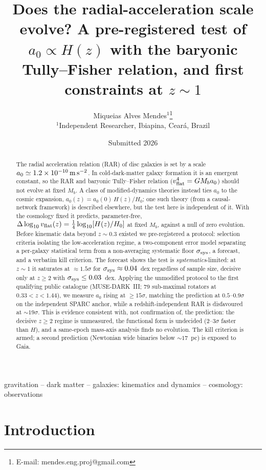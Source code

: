 \documentclass[fleqn,usenatbib]{mnras}
\title[Does the radial-acceleration scale evolve?]{Does the
radial-acceleration scale evolve? A pre-registered test of
$a_0\propto H(z)$ with the baryonic Tully--Fisher relation,
and first constraints at $z\sim1$}
\author[M. A. Mendes]{Miqueias Alves Mendes$^{1}$\thanks{E-mail:
mendes.eng.proj@gmail.com}\\
$^{1}$Independent Researcher, Ibiapina, Cear\'a, Brazil}
\date{Submitted 2026}
\newcommand{\dlogv}{\Delta\log_{10} v_{\rm flat}}
\newcommand{\azero}{a_0}
\newcommand{\ssys}{\sigma_{\rm sys}}
\begin{document}
\maketitle

\begin{abstract}
The radial acceleration relation (RAR) of disc galaxies is set by a scale
$\azero\simeq1.2\times10^{-10}\,{\rm m\,s^{-2}}$. In cold-dark-matter galaxy
formation it is an emergent constant, so the RAR and baryonic Tully--Fisher
relation ($v_{\rm flat}^4=GM_b\azero$) should not evolve at fixed $M_b$. A class of
modified-dynamics theories instead ties $\azero$ to the cosmic expansion,
$\azero(z)=\azero(0)\,H(z)/H_0$; one such theory (from a causal-network framework)
is described elsewhere, but the test here is independent of it. With the cosmology
fixed it predicts, parameter-free, $\dlogv(z)=\tfrac14\log_{10}[H(z)/H_0]$ at fixed
$M_b$, against a null of zero evolution. Before kinematic data beyond $z\sim0.3$
existed we pre-registered a protocol: selection criteria isolating the
low-acceleration regime, a two-component error model separating a per-galaxy
statistical term from a non-averaging systematic floor $\ssys$, a forecast, and a
verbatim kill criterion. The forecast shows the test is \emph{systematics}-limited:
at $z\sim1$ it saturates at $\approx1.5\sigma$ for $\ssys\approx0.04$~dex regardless
of sample size, decisive only at $z\ge2$ with $\ssys\le0.03$~dex. Applying the
unmodified protocol to the first qualifying public catalogue
(MUSE-DARK~III; 79 sub-maximal rotators at $0.33<z<1.44$), we measure
$\azero$ rising at $\ge15\sigma$, matching the prediction at $0.5$--$0.9\sigma$ on
the independent SPARC anchor, while a redshift-independent RAR is disfavoured at
$\sim19\sigma$. This is evidence consistent with, not confirmation of, the
prediction: the decisive $z\ge2$ regime is unmeasured, the functional form is
undecided ($2$--$3\sigma$ faster than $H$), and a same-epoch mass-axis analysis
finds no evolution. The kill criterion is armed; a second prediction
(Newtonian wide binaries below $\sim17$~pc) is exposed to Gaia.
\end{abstract}

\begin{keywords}
gravitation -- dark matter -- galaxies: kinematics and dynamics --
cosmology: observations
\end{keywords}

\section{Introduction}\label{sec:intro}
\end{document}
